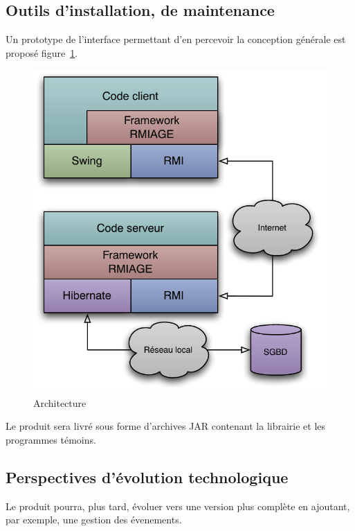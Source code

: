 \subsection{Outils d’installation, de maintenance}
Un prototype de l'interface permettant d'en percevoir la conception générale est proposé figure~\ref{fig:archi}.

\begin{figure}[htbp]
	\centering
		\includegraphics[scale=1]{../diagrammes/architecture.pdf}
	\caption{Architecture}
	\label{fig:archi}
\end{figure}

Le produit sera livré sous forme d'archives JAR contenant la librairie et les programmes témoins.

\subsection{Perspectives d’évolution technologique}

Le produit pourra, plus tard, évoluer vers une version plus complète en ajoutant, par exemple, une gestion des évenements.
